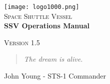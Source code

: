 \documentclass{article}
\begin{document}
\begin{titlepage}

\begin{center}

\texttt{[image: logo1000.png]}\\[1cm]

\textsc{\LARGE Space Shuttle Vessel}\\[1.5cm]

\huge \bfseries SSV Operations Manual\\[0.4cm]

\vfill

\textsc{\Large Version 1.5}\\[0.5cm]

\end{center}
\end{titlepage}


\newpage
\thispagestyle{empty}
\vspace*{\fill}
\begin{quote}
\centering
\textit{The dream is alive.}
\end{quote}
\begin{flushright}
John Young - STS-1 Commander
\end{flushright}
\vspace*{\fill}
\newpage





\newpage
\tableofcontents


\newpage

\newpage

\newpage

\newpage

\newpage

\newpage

\newpage

\newpage

\newpage

\newpage

\newpage

\newpage

\end{document}
